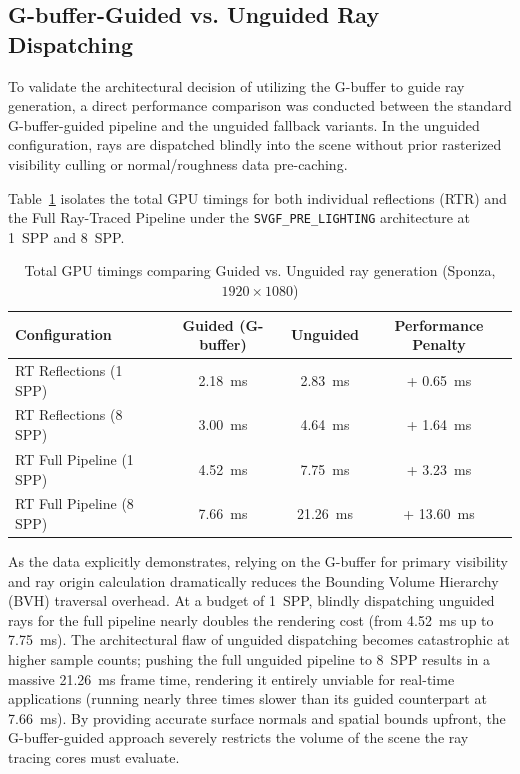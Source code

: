 \documentclass[12pt,a4paper]{report}
\begin{document}
\subsection{G-buffer-Guided vs. Unguided Ray Dispatching}
\label{sec:guided-vs-unguided}
To validate the architectural decision of utilizing the G-buffer to guide ray generation, a direct performance comparison was conducted between the standard G-buffer-guided pipeline and the unguided fallback variants.
In the unguided configuration, rays are dispatched blindly into the scene without prior rasterized visibility culling or normal/roughness data pre-caching. 

Table~\ref{tab:guided-vs-unguided} isolates the total GPU timings for both individual reflections (RTR) and the Full Ray-Traced Pipeline under the \texttt{SVGF\_PRE\_LIGHTING} architecture at 1~SPP and 8~SPP.

\begin{table}[H]
\centering
\begin{tabular}{|l|c|c|c|}
\hline
\textbf{Configuration} & \textbf{Guided (G-buffer)} & \textbf{Unguided} & \textbf{Performance Penalty} \\
\hline
RT Reflections (1 SPP) & 2.18~ms & 2.83~ms & + 0.65~ms \\
RT Reflections (8 SPP) & 3.00~ms & 4.64~ms & + 1.64~ms \\
RT Full Pipeline (1 SPP) & 4.52~ms & 7.75~ms & + 3.23~ms \\
RT Full Pipeline (8 SPP) & 7.66~ms & 21.26~ms & + 13.60~ms \\
\hline
\end{tabular}
\caption{Total GPU timings comparing Guided vs. Unguided ray generation (Sponza, $1920 \times 1080$)}
\label{tab:guided-vs-unguided}
\end{table}

As the data explicitly demonstrates, relying on the G-buffer for primary visibility and ray origin calculation dramatically reduces the Bounding Volume Hierarchy (BVH) traversal overhead.
At a budget of 1~SPP, blindly dispatching unguided rays for the full pipeline nearly doubles the rendering cost (from 4.52~ms up to 7.75~ms).
The architectural flaw of unguided dispatching becomes catastrophic at higher sample counts; pushing the full unguided pipeline to 8~SPP results in a massive 21.26~ms frame time,
rendering it entirely unviable for real-time applications (running nearly three times slower than its guided counterpart at 7.66~ms). By providing accurate surface normals and spatial bounds upfront,
the G-buffer-guided approach severely restricts the volume of the scene the ray tracing cores must evaluate.
\end{document}
